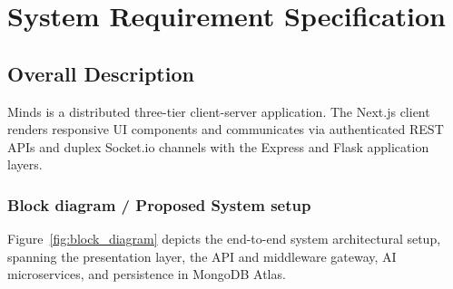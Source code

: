 \documentclass[12pt,a4paper]{report}
\begin{document}
\chapter{System Requirement Specification}

\section{Overall Description}
Minds is a distributed three-tier client-server application. The Next.js client renders responsive UI components and communicates via authenticated REST APIs and duplex Socket.io channels with the Express and Flask application layers.

\subsection{Block diagram / Proposed System setup}
Figure~\ref{fig:block_diagram} depicts the end-to-end system architectural setup, spanning the presentation layer, the API and middleware gateway, AI microservices, and persistence in MongoDB Atlas.
\end{document}
